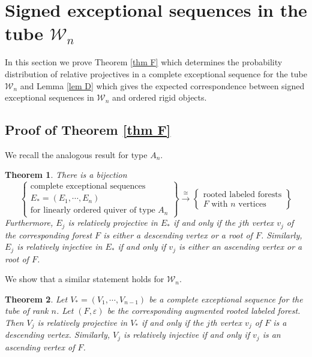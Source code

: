 \documentclass[11pt]{amsart}
\newtheorem{thm}{Theorem}[section]
\theoremstyle{definition}
\theoremstyle{remark}
\numberwithin{equation}{section}
\newcommand{\cW}{\ensuremath{{\mathcal{W}}}}
\begin{document}
\section{Signed exceptional sequences in the tube $\cW_n$}\label{sec: signed exc seq in Wn}

In this section we prove Theorem \ref{thm F} which determines the probability distribution of relative projectives in a complete exceptional sequence for the tube $\cW_n$ and Lemma \ref{lem D} which gives the expected correspondence between signed exceptional sequences in $\cW_n$ and ordered rigid objects.

\subsection{Proof of Theorem \ref{thm F}}\label{ss: proof of Theorem G}

We recall the analogous result for type $A_n$.

\begin{thm}\cite{Ig-Sen}\label{thm: forests in type An}
There is a bijection
\[
	\left\{
	\begin{matrix}\text{complete exceptional sequences}\\
	E_\ast=(E_1,\cdots,E_n)\\
	\text{for linearly ordered quiver of type $A_n$}
	\end{matrix}
	\right\}
	\xrightarrow\cong
	\left\{
	\begin{matrix}\text{rooted labeled forests}\\
	\text{$F$ with $n$ vertices}
	\end{matrix}
	\right\}
\]
 Furthermore, $E_j$ is relatively projective in $E_\ast$ if and only if the $j$th vertex $v_j$ of the corresponding forest $F$ is either a descending vertex or a root of $F$. Similarly, $E_j$ is relatively injective in $E_\ast$ if and only if $v_j$ is either an ascending vertex or a root of $F$.
\end{thm}


We show that a similar statement holds for $\cW_n$.

\begin{thm}\label{thm: relative projectives in Wn}
Let $V_\ast=(V_1,\cdots,V_{n-1})$ be a complete exceptional sequence for the tube of rank $n$. Let $(F,\varepsilon)$ be the corresponding augmented rooted labeled forest. Then $V_j$ is relatively projective in $V_\ast$ if and only if the $j$th vertex $v_j$ of $F$ is a descending vertex. Similarly, $V_j$ is relatively injective if and only if $v_j$ is an ascending vertex of $F$.
\end{thm}
\end{document}
